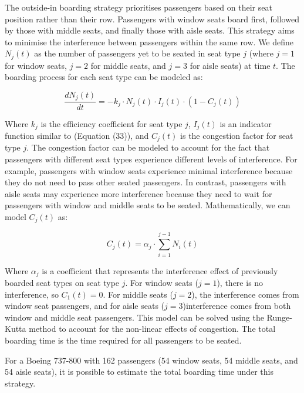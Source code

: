 \documentclass[12pt]{article}
\begin{document}
The outside-in boarding strategy prioritises passengers based on their seat position rather than their row. Passengers with window seats board first, followed by those with middle seats, and finally those with aisle seats. This strategy aims to minimise the interference between passengers within the same row. We define $N_j(t)$ as the number of passengers yet to be seated in seat type $j$ (where $j = 1$ for window seats, $j = 2$ for middle seats, and $j = 3$ for aisle seats) at time $t$. The boarding process for each seat type can be modeled as:

\begin{equation}
\frac{dN_j(t)}{dt} = -k_j \cdot N_j(t) \cdot I_j(t) \cdot (1 - C_j(t))
\end{equation}

Where $k_j$ is the efficiency coefficient for seat type $j$, $I_j(t)$ is an indicator function similar to (Equation (33)), and $C_j(t)$ is the congestion factor for seat type $j$. The congestion factor can be modeled to account for the fact that passengers with different seat types experience different levels of interference. For example, passengers with window seats experience minimal interference because they do not need to pass other seated passengers. In contrast, passengers with aisle seats may experience more interference because they need to wait for passengers with window and middle seats to be seated. Mathematically, we can model $C_j(t)$ as:

\begin{equation}
C_j(t) = \alpha_j \cdot \sum_{i=1}^{j-1} N_i(t)
\end{equation}

Where $\alpha_j$ is a coefficient that represents the interference effect of previously boarded seat types on seat type $j$. For window seats ($j = 1$), there is no interference, so $C_1(t) = 0$. For middle seats ($j = 2$), the interference comes from window seat passengers, and for aisle seats ($j = 3$)interference comes from both window and middle seat passengers. This model can be solved using the Runge-Kutta method to account for the non-linear effects of congestion. The total boarding time is the time required for all passengers to be seated.

For a Boeing 737-800 with 162 passengers (54 window seats, 54 middle seats, and 54 aisle seats), it is possible to estimate the total boarding time under this strategy.
\end{document}
